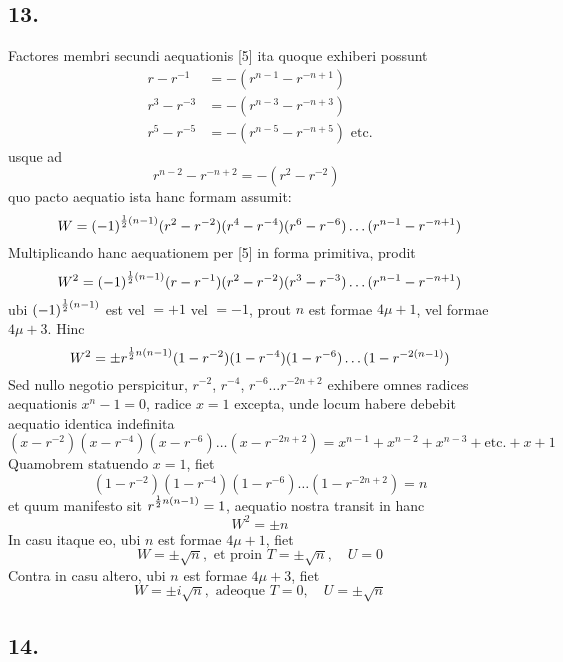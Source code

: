 \documentclass[twoside,12pt, showframe]{memoir}
\let\oldfrac\frac
\def\frac#1#2{\mathchoice{\tfrac{#1}{#2}}{\oldfrac{#1}{#2}}{\genfrac{}{}{}{2}{#1}{#2\mathstrut}}{\genfrac{}{}{}{3}{#1}{#2\mathstrut}}}
\begin{document}
\subsection*{13.}
 
Factores membri secundi aequationis [5] ita quoque exhiberi possunt
\[\begin{aligned}
r-r^{-1} & =-(r^{n-1}-r^{-n+1}) \\
r^{3}-r^{-3} & =-(r^{n-3}-r^{-n+3}) \\
r^{5}-r^{-5} & =-(r^{n-5}-r^{-n+5}) \text{ etc.}
\end{aligned}\]
usque ad
\[r^{n-2}-r^{-n+2}=-(r^{2}-r^{-2})\phantom{\text{ etc.}}\]
quo pacto aequatio ista hanc formam assumit:\clearpage\noindent%
\[W=(-1)^{\frac{1}{2}(n-1)}(r^{2}-r^{-2})(r^{4}-r^{-4})(r^{6}-r^{-6}) \ldots (r^{n-1}-r^{-n+1})\]
Multiplicando hanc aequationem per [5] in forma primitiva, prodit
\[W^{2}=(-1)^{\frac{1}{2}(n-1)}(r-r^{-1})(r^{2}-r^{-2})(r^{3}-r^{-3}) \ldots (r^{n-1}-r^{-n+1})\]
ubi \((-1)^{\frac{1}{2}(n-1)}\) est vel \(=+1\) vel \(=-1\), prout \(n\) est formae \(4 \mu+1\), vel formae \(4 \mu+3\). Hinc
\[W^{2}= \pm r^{\frac{1}{2} n(n-1)}(1-r^{-2})(1-r^{-4})(1-r^{-6}) \ldots(1-r^{-2(n-1)})\]
Sed nullo negotio perspicitur, \(r^{-2}\), \(r^{-4}\), \(r^{-6} \ldots r^{-2 n+2}\) exhibere omnes radices aequationis \(x^{n}-1=0\), radice \(x=1\) excepta, unde locum habere debebit aequatio identica indefinita
\[(x-r^{-2})(x-r^{-4})(x-r^{-6}) \ldots(x-r^{-2 n+2})=x^{n-1}+x^{n-2}+x^{n-3}+\text{etc.}+x+1\]
Quamobrem statuendo \(x=1\), fiet
\[(1-r^{-2})(1-r^{-4})(1-r^{-6}) \ldots(1-r^{-2 n+2})=n\]
et quum manifesto sit \(r^{\frac{1}{2} n(n-1)}=1\), aequatio nostra transit in hanc
\[W^{2}= \pm n \tag{6}\]
In casu itaque eo, ubi \(n\) est formae \(4 \mu+1\), fiet
\[W= \pm \surd n, \text{ et proin } T= \pm \surd n, \quad U=0\]
Contra in casu altero, ubi \(n\) est formae \(4 \mu+3\), fiet
\[W= \pm i \surd n, \text{ adeoque } T=0, \quad U= \pm \surd n\]

\subsection*{14.}
 
\end{document}
